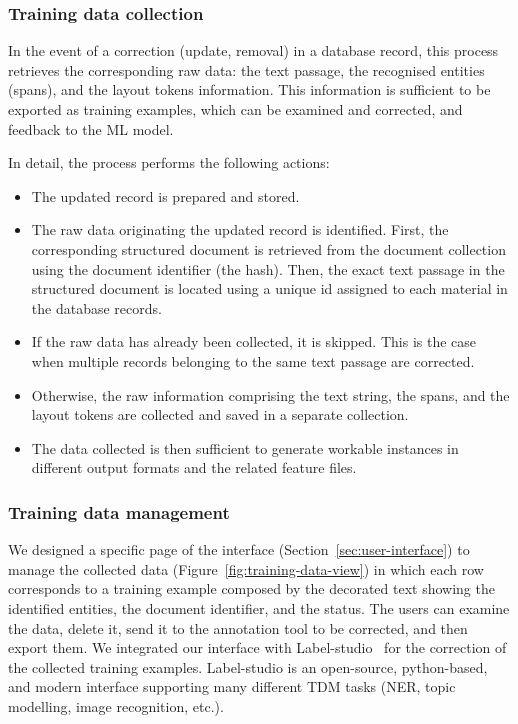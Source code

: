 \subsubsection{Training data collection}
In the event of a correction (update, removal) in a database record, this process retrieves the corresponding raw data: the text passage, the recognised entities (spans), and the layout tokens information. 
This information is sufficient to be exported as training examples, which can be examined and corrected, and feedback to the ML model. 

In detail, the process performs the following actions:
\begin{itemize}
    \item The updated record is prepared and stored.
    \item The raw data originating the updated record is identified. First, the corresponding structured document is retrieved from the document collection using the document identifier (the hash). Then, the exact text passage in the structured document is located using a unique id assigned to each material in the database records.
    \item If the raw data has already been collected, it is skipped. This is the case when multiple records belonging to the same text passage are corrected.
    \item Otherwise, the raw information comprising the text string, the spans, and the layout tokens are collected and saved in a separate collection.
    \item The data collected is then sufficient to generate workable instances in different output formats and the related feature files.
\end{itemize}

\subsubsection{Training data management}
We designed a specific page of the interface (Section~\ref{sec:user-interface}) to manage the collected data (Figure~\ref{fig:training-data-view}) in which each row corresponds to a training example composed by the decorated text showing the identified entities, the document identifier, and the status. 
The users can examine the data, delete it, send it to the annotation tool to be corrected, and then export them.
We integrated our interface with Label-studio~\cite{Label_Studio} for the correction of the collected training examples. 
Label-studio is an open-source, python-based, and modern interface supporting many different TDM tasks (NER, topic modelling, image recognition, etc.). 

